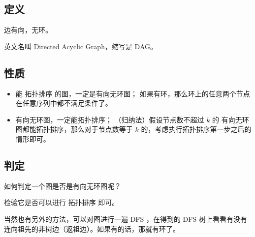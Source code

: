 
\subsection{定义}

边有向，无环。

英文名叫 Directed Acyclic Graph，缩写是 DAG。

\subsection{性质}

\begin{itemize}
\item 能  拓扑排序  的图，一定是有向无环图；
  如果有环，那么环上的任意两个节点在任意序列中都不满足条件了。
\item 有向无环图，一定能拓扑排序；
  （归纳法）假设节点数不超过 $k$ 的 有向无环图都能拓扑排序，那么对于节点数等于 $k$ 的，考虑执行拓扑排序第一步之后的情形即可。
\end{itemize}

\subsection{判定}

如何判定一个图是否是有向无环图呢？

检验它是否可以进行  拓扑排序  即可。

当然也有另外的方法，可以对图进行一遍  DFS ，在得到的 DFS 树上看看有没有连向祖先的非树边（返祖边）。如果有的话，那就有环了。
